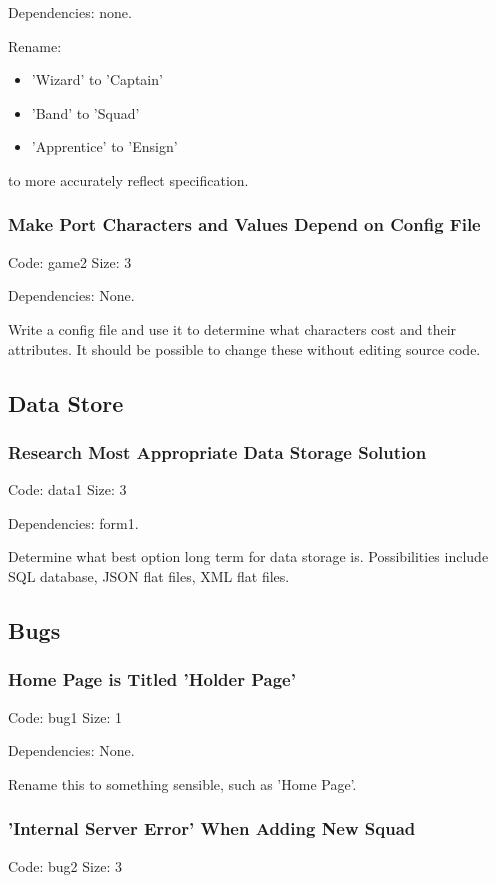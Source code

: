 \documentclass[a4paper,12pt]{article}
\begin{document}
Dependencies: none.

Rename: 
\begin{itemize}
\item 'Wizard' to 'Captain'
\item 'Band' to 'Squad'
\item 'Apprentice' to 'Ensign'
\end{itemize}
to more accurately reflect specification.

\subsubsection{Make Port Characters and Values Depend on Config File}
Code: game2	\hfill Size: 3

Dependencies: None.

Write a config file and use it to determine what characters cost and their attributes. It should be possible to change these without editing source code.


\subsection{Data Store}

\subsubsection{Research Most Appropriate Data Storage Solution}
\label{data_spike}
Code: data1 \hfill Size: 3

Dependencies: form1.

Determine what best option long term for data storage is. Possibilities include SQL database, JSON flat files, XML flat files.

\subsection{Bugs}

\subsubsection{Home Page is Titled 'Holder Page'}
Code: bug1 \hfill Size: 1

Dependencies: None.

Rename this to something sensible, such as 'Home Page'.

\subsubsection{'Internal Server Error' When Adding New Squad}
Code: bug2 \hfill Size: 3
\end{document}
